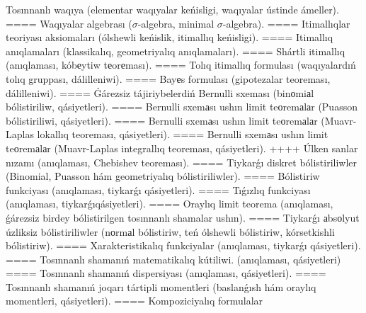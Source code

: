 Tosınnanlı waqıya (elementar waqıyalar keńisligi, waqıyalar ústinde ámeller).
====
Waqıyalar algebrası ($\sigma$-algebra, minimal $\sigma$-algebra).
====
Itimallıqlar teoriyası aksiomaları (ólshewli keńislik, itimallıq keńisligi).
====
Itimallıq anıqlamaları (klassikalıq, geometriyalıq anıqlamaları).
====
Shártli itimallıq (anıqlaması, kóbеytiw tеorеması).
====
Tolıq itimallıq formulası (waqıyalardıń tolıq gruppası, dálilleniwi).
====
Bayеs formulası (gipotezalar teoreması, dálilleniwi).
====
Ǵárezsiz tájiriybelerdiń Bernulli sxeması (binоmiаl bólistiriliw, qásiyetleri).
====
Bernulli sxemаsı ushın limit teоremаlаr (Puasson bólistiriliwi, qásiyetleri).
====
Bernulli sxemаsı ushın limit teоremаlаr (Muavr-Laplas lokallıq teoreması, qásiyetleri).
====
Bernulli sxemаsı ushın limit teоremаlаr (Muavr-Laplas integrallıq teoreması, qásiyetleri).
++++
Úlken sanlar nızamı (anıqlaması, Chebishev teoreması).
====
Tiykarǵı diskret bólistiriliwler (Binomial, Puasson hám geometriyalıq bólistiriliwler).
====
Bólistiriw funkciyası (anıqlaması, tiykarǵı qásiyetleri).
====
Tıǵızlıq funkciyası (anıqlaması, tiykarǵıqásiyetleri).
====
Oraylıq limit teorema (anıqlaması, ǵárezsiz birdey bólistirilgen tosınnanlı shamalar ushın).
====
Tiykarǵı аbsоlyut úzliksiz bólistiriliwler (nоrmаl bólistiriw, teń ólshewli bólistiriw, kórsetkishli bólistiriw). 
====
Xarakteristikalıq funkciyalar (anıqlaması, tiykarǵı qásiyetleri).
====
Tosınnanlı shamanıń matematikalıq kútiliwi. (anıqlaması, qásiyetleri)
====
Tosınnanlı shamanıń dispersiyası (anıqlaması, qásiyetleri).
====
Tosınnanlı shamanıń joqarı tártipli momentleri (baslanǵısh hám oraylıq momentleri, qásiyetleri).
====
Kompoziciyalıq formulalar